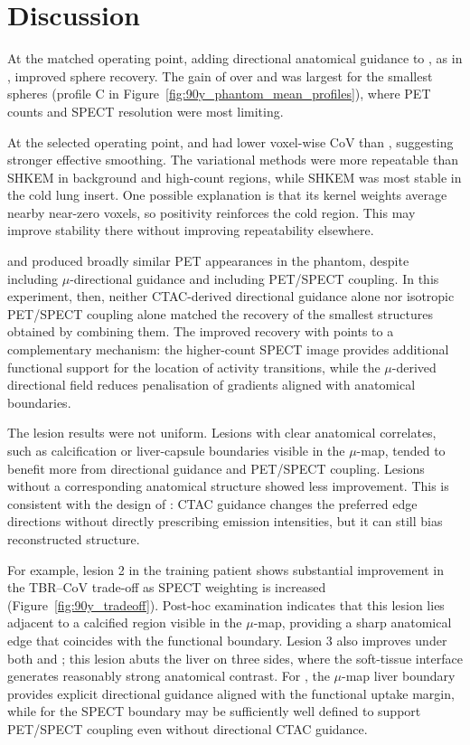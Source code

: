 \section{Discussion}
\label{sec:90y_discussion}

At the matched operating point, adding directional anatomical guidance to \wtnv, as in \wdtnv, improved sphere recovery. The gain of \wdtnv over \wtnv and \dtv was largest for the smallest spheres (profile C in Figure~\ref{fig:90y_phantom_mean_profiles}), where PET counts and SPECT resolution were most limiting.

At the selected operating point, \dtv and \wtnv had lower voxel-wise CoV than \wdtnv, suggesting stronger effective smoothing. The variational methods were more repeatable than SHKEM in background and high-count regions, while SHKEM was most stable in the cold lung insert. One possible explanation is that its kernel weights average nearby near-zero voxels, so positivity reinforces the cold region. This may improve stability there without improving repeatability elsewhere.

\dtv and \wtnv produced broadly similar PET appearances in the phantom, despite \dtv including $\mu$-directional guidance and \wtnv including PET/SPECT coupling. In this experiment, then, neither CTAC-derived directional guidance alone nor isotropic PET/SPECT coupling alone matched the recovery of the smallest structures obtained by combining them. The improved recovery with \wdtnv points to a complementary mechanism: the higher-count SPECT image provides additional functional support for the location of activity transitions, while the $\mu$-derived directional field reduces penalisation of gradients aligned with anatomical boundaries.

The lesion results were not uniform. Lesions with clear anatomical correlates, such as calcification or liver-capsule boundaries visible in the $\mu$-map, tended to benefit more from directional guidance and PET/SPECT coupling. Lesions without a corresponding anatomical structure showed less improvement. This is consistent with the design of \wdtnv: CTAC guidance changes the preferred edge directions without directly prescribing emission intensities, but it can still bias reconstructed structure.

For example, lesion 2 in the training patient shows substantial improvement in the TBR--CoV trade-off as SPECT weighting is increased (Figure~\ref{fig:90y_tradeoff}). Post-hoc examination indicates that this lesion lies adjacent to a calcified region visible in the $\mu$-map, providing a sharp anatomical edge that coincides with the functional boundary. Lesion 3 also improves under both \wdtnv and \wtnv; this lesion abuts the liver on three sides, where the soft-tissue interface generates reasonably strong anatomical contrast. For \wdtnv, the $\mu$-map liver boundary provides explicit directional guidance aligned with the functional uptake margin, while for \wtnv the SPECT boundary may be sufficiently well defined to support PET/SPECT coupling even without directional CTAC guidance.

